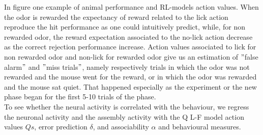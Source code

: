 In figure one example of animal performance and RL-models action values. When the odor is rewarded the expectancy of reward related to the lick action reproduce the hit performance as one could intuitively predict, while, for non rewarded odor, the reward expectation associated to the no-lick action decrease as the correct rejection performance increase. Action values associated to lick for non rewarded odor and non-lick for rewarded odor give us an estimation of $"$false alarm$"$ and $"$miss trials$"$, namely respectively trials in which the odor was not rewarded and the mouse went for the reward, or in which the odor was rewarded and the mouse sat quiet. That happened especially as the experiment or the new phase began for the first 5-10 trials of the phase.\\

To see whether the neural activity is correlated with the behaviour, we regress the neuronal activity and the assembly activity with the Q L-F model action values $Qs$, error prediction $\delta$, and associability $\alpha$ and behavioural measures. 
    
